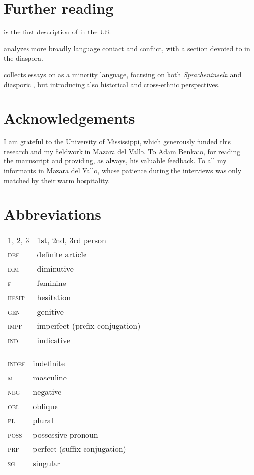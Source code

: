 \documentclass[output=paper]{langsci/langscibook}
\begin{document}
\section*{Further reading}
\begin{furtherreading}
\item \citet{Rouchdy_arabic_1992} is the first description of  in the US.
\item \citet{Rouchdy2002} analyzes more broadly language contact and conflict, with a section devoted to  in the {diaspora}.
\item \citet{Owens2000editor} collects essays on  as a minority language, {focusing} on both \textit{Spracheninseln} and diasporic , but introducing also historical and cross-ethnic perspectives.
\end{furtherreading}
 
 \section*{Acknowledgements}
I am grateful to the University of Mississippi, which generously funded this research and my fieldwork in {Mazara del Vallo}. To Adam Benkato, for reading the manuscript and providing, as always, his valuable feedback. To all my informants in {Mazara del Vallo}, whose patience during the interviews was only matched by their warm hospitality.
 
 \section*{Abbreviations}

\begin{tabularx}{.525\textwidth}{@{}lQ@{}}
\textsc{1, 2, 3} & 1st, 2nd, 3rd person \\
\textsc{def} & {definite} {article} \\
\textsc{dim} & {diminutive} \\
\textsc{f} & feminine \\
\textsc{hesit} & hesitation \\
\textsc{gen} & genitive \\
\textsc{impf} & imperfect (prefix conjugation) \\
\textsc{ind} & indicative \\
\end{tabularx}%
\begin{tabularx}{.475\textwidth}{@{}lQ@{}}
\textsc{indef} & indefinite \\
\textsc{m} & masculine \\
\textsc{neg} & negative \\
\textsc{obl} & oblique \\
\textsc{pl} & plural \\
\textsc{poss} & possessive pronoun \\
\textsc{prf} & perfect (suffix conjugation) \\
\textsc{sg} & singular \\
\end{tabularx}%


\sloppy\printbibliography[heading=subbibliography,notkeyword=this]
\end{document}
